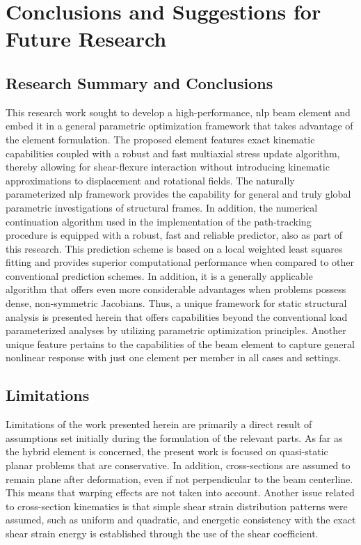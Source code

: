 \chapter{Conclusions and Suggestions for Future Research}

\section{Research Summary and Conclusions}
This research work sought to develop a high-performance, \acrshort{nlp} beam 
element 
and embed it in a general parametric optimization framework that takes 
advantage of 
the element formulation. The proposed element features exact kinematic 
capabilities 
coupled with a robust and fast multiaxial stress update algorithm, thereby 
allowing 
for shear-flexure interaction without introducing kinematic approximations to 
displacement and rotational fields. The naturally parameterized \acrshort{nlp} 
framework provides the capability for general and truly global parametric 
investigations of structural frames. In addition, the numerical continuation 
algorithm 
used in the implementation of the path-tracking procedure is equipped with a 
robust, 
fast and reliable predictor, also as part of this research. This prediction 
scheme is 
based on a local weighted least squares fitting and provides superior 
computational 
performance when compared to other conventional prediction schemes. In 
addition, it is 
a generally applicable algorithm that offers even more considerable advantages 
when 
problems possess dense, non-symmetric Jacobians. Thus, a unique framework for 
static structural analysis is presented herein that offers capabilities beyond 
the conventional load parameterized analyses by utilizing parametric 
optimization principles. Another unique feature pertains to the capabilities 
of the beam element to capture general nonlinear response with just one element 
per member in all cases and settings.

\section{Limitations}

Limitations of the work presented herein are primarily a direct 
result of 
assumptions set initially during the formulation of the relevant parts. As far 
as the 
hybrid element is concerned, the present work is focused on quasi-static planar 
problems that are conservative. In addition, cross-sections are assumed to 
remain 
plane after deformation, even if not perpendicular to the beam centerline. This 
means 
that warping effects are not taken into account. Another issue related to 
cross-section 
kinematics is that simple shear strain 
distribution 
patterns 
were assumed, such as uniform and quadratic, and energetic consistency with the 
exact 
shear strain energy is established through the use of the shear coefficient.

